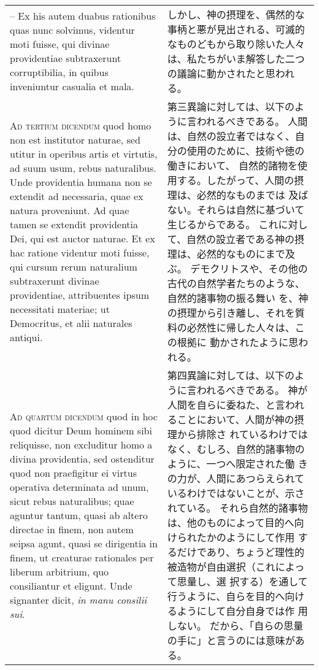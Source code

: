 \documentclass[10pt]{jsarticle} %
\begin{document}
\begin{longtable}{p{21em}p{21em}}
\\

-- Ex his autem duabus rationibus
quas nunc solvimus, videntur moti fuisse, qui divinae providentiae
subtraxerunt corruptibilia, in quibus inveniuntur casualia et mala.

&

しかし、神の摂理を、偶然的な事柄と悪が見出される、可滅的なものどもから取り除いた人々
 は、私たちがいま解答した二つの議論に動かされたと思われる。


\\



{\scshape Ad tertium dicendum} quod homo non est
institutor naturae, sed utitur in operibus artis et virtutis, ad suum
usum, rebus naturalibus. Unde providentia humana non se extendit ad
necessaria, quae ex natura proveniunt. Ad quae tamen se extendit
providentia Dei, qui est auctor naturae. Et ex hac ratione videntur moti
fuisse, qui cursum rerum naturalium subtraxerunt divinae providentiae,
attribuentes ipsum necessitati materiae; ut Democritus, et alii
naturales antiqui.

&


第三異論に対しては、以下のように言われるべきである。
人間は、自然の設立者ではなく、自分の使用のために、技術や徳の働きにおいて、
 自然的諸物を使用する。したがって、人間の摂理は、必然的なものまでは
 及ばない。それらは自然に基づいて生じるからである。
これに対して、自然の設立者である神の摂理は、必然的なものにまで及ぶ。
デモクリトスや、その他の古代の自然学者たちのような、自然的諸事物の振る舞い
 を、神の摂理から引き離し、それを質料の必然性に帰した人々は、この根拠に
 動かされたように思われる。

\\


{\scshape Ad quartum dicendum} quod in hoc quod dicitur
Deum hominem sibi reliquisse, non excluditur homo a divina providentia,
sed ostenditur quod non praefigitur ei virtus operativa determinata ad
unum, sicut rebus naturalibus; quae aguntur tantum, quasi ab altero
directae in finem, non autem seipsa agunt, quasi se dirigentia in finem,
ut creaturae rationales per liberum arbitrium, quo consiliantur et
eligunt. Unde signanter dicit, {\itshape in manu consilii sui}. 

&

第四異論に対しては、以下のように言われるべきである。
神が人間を自らに委ねた、と言われることにおいて、人間が神の摂理から排除さ
 れているわけではなく、むしろ、自然的諸事物のように、一つへ限定された働
 きの力が、人間にあつらえられているわけではないことが、示されている。
それら自然的諸事物は、他のものによって目的へ向けられたかのようにして作用
 するだけであり、ちょうど理性的被造物が自由選択（これによって思量し、選
 択する）を通して行うように、自らを目的へ向けるようにして自分自身では作
 用しない。
だから、「自らの思量の手に」と言うのには意味がある。


\end{longtable}
\end{document}
